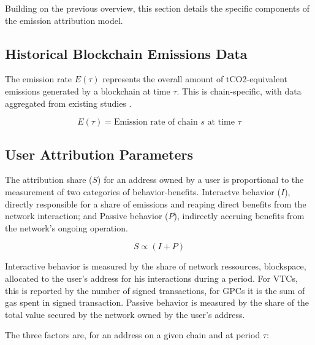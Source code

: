 \documentclass[11pt]{report}
\begin{document}
Building on the previous overview, this section details the specific components of the emission attribution model.

\subsection{Historical Blockchain Emissions Data}
The emission rate \(E(\tau)\) represents the overall amount of tCO2-equivalent emissions generated by a blockchain at time $\tau$. This is chain-specific, with data aggregated from existing studies \cite{neumuellerCambridgeBitcoinElectricity2021,stollCarbonFootprintBitcoin2019}.

\begin{equation}
    E(\tau) = \text{Emission rate of chain $s$ at time $\tau$}
    \label{eq:emission_rate}
\end{equation}


\subsection{User Attribution Parameters}

The attribution share ($S$) for an address owned by a user is proportional to the measurement of two categories of behavior-benefits. Interactve behavior ($I$), directly responsible for a share of emissions and reaping direct benefits from the network interaction; and Passive behavior ($P$), indirectly accruing benefits from the network's ongoing operation.

\begin{equation}
    S \propto (I + P)
    \label{eq:attribution_share}
\end{equation}

Interactive behavior is measured by the share of network ressources, blockspace, allocated to the user's address for his interactions during a period. For \ac{VTC}s, this is reported by the number of signed transactions, for \ac{GPC}s it is the sum of gas spent in signed transaction. Passive behavior is measured by the share of the total value secured by the network owned by the user's address.

The three factors are, for an address on a given chain and at period $\tau$:
\end{document}
